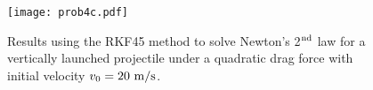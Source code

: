 {\begin{figure}[H]
    \centering
    \texttt{[image: prob4c.pdf]}
    \caption{Results using the RKF45 method to solve Newton's 2$^{\rm nd}$ law for a vertically launched projectile under a quadratic drag force with initial velocity $v_0 = 20~{\rm m/s}$.}
    \label{fig:prob4c}
\end{figure}


}

    

